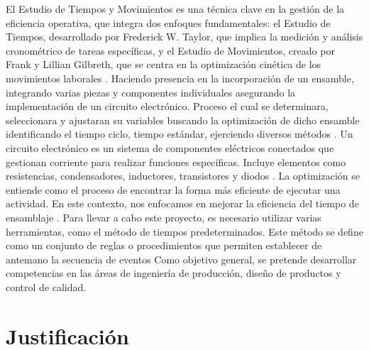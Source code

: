     El Estudio de Tiempos y Movimientos es una técnica clave en la gestión de la eficiencia operativa, que integra dos enfoques fundamentales: el Estudio de Tiempos, desarrollado por Frederick W. Taylor, que implica la medición y análisis cronométrico de tareas específicas, y el Estudio de Movimientos, creado por Frank y Lillian Gilbreth, que se centra en la optimización cinética de los movimientos laborales \cite{Maynards}.
    Haciendo presencia en la incorporación de un ensamble, integrando varias piezas y componentes individuales asegurando la implementación de un circuito electrónico. Proceso el cual se determinara, seleccionara y ajustaran su variables buscando la optimización de dicho ensamble identificando el tiempo ciclo, tiempo estándar, ejerciendo diversos métodos \cite{glossar_item24}. 
    Un circuito electrónico es un sistema de componentes eléctricos conectados que gestionan corriente para realizar funciones específicas. Incluye elementos como resistencias, condensadores, inductores, transistores y diodos \cite{fadesaing_circuitos}.
    La optimización se entiende como el proceso de encontrar la forma más eficiente de ejecutar una actividad. En este contexto, nos enfocamos en mejorar la eficiencia del tiempo de ensamblaje \cite{significados_optimizacion}.
    Para llevar a cabo este proyecto, es necesario utilizar varias herramientas, como el método de tiempos predeterminados. Este método se define como un conjunto de reglas o procedimientos que permiten establecer de antemano la secuencia de eventos \cite{H.B.MAYNARD}
    Como objetivo general, se pretende desarrollar competencias en las áreas de ingeniería de producción, diseño de productos y control de calidad.
    
    \section{Justificación}
    
